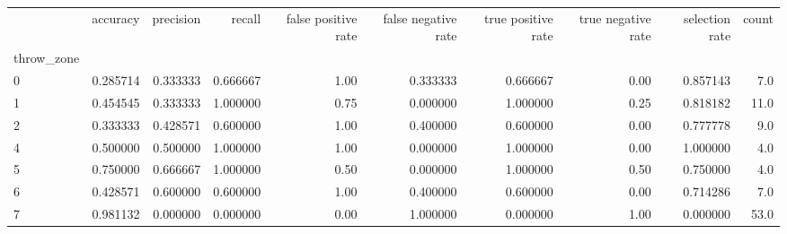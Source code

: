 \begin{tabular}{lrrrrrrrrr}
\toprule
{} &  accuracy &  precision &    recall &  false positive rate &  false negative rate &  true positive rate &  true negative rate &  selection rate &  count \\
throw\_zone &           &            &           &                      &                      &                     &                     &                 &        \\
\midrule
0          &  0.285714 &   0.333333 &  0.666667 &                 1.00 &             0.333333 &            0.666667 &                0.00 &        0.857143 &    7.0 \\
1          &  0.454545 &   0.333333 &  1.000000 &                 0.75 &             0.000000 &            1.000000 &                0.25 &        0.818182 &   11.0 \\
2          &  0.333333 &   0.428571 &  0.600000 &                 1.00 &             0.400000 &            0.600000 &                0.00 &        0.777778 &    9.0 \\
4          &  0.500000 &   0.500000 &  1.000000 &                 1.00 &             0.000000 &            1.000000 &                0.00 &        1.000000 &    4.0 \\
5          &  0.750000 &   0.666667 &  1.000000 &                 0.50 &             0.000000 &            1.000000 &                0.50 &        0.750000 &    4.0 \\
6          &  0.428571 &   0.600000 &  0.600000 &                 1.00 &             0.400000 &            0.600000 &                0.00 &        0.714286 &    7.0 \\
7          &  0.981132 &   0.000000 &  0.000000 &                 0.00 &             1.000000 &            0.000000 &                1.00 &        0.000000 &   53.0 \\
\bottomrule
\end{tabular}
